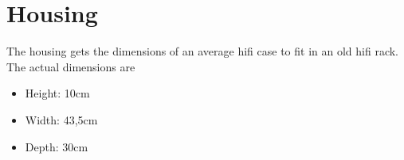 \section{Housing}
The housing gets the dimensions of an average hifi case to fit in an old hifi rack.
The actual dimensions are
\begin{itemize}
	\item Height: 10cm
	\item Width: 43,5cm
	\item Depth: 30cm
\end{itemize}